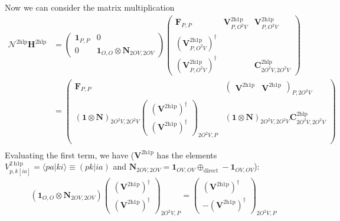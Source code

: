 Now we can consider the matrix multiplication
\begin{align}
    \bm{\mathcal{N}}^{2 \mathrm{hlp}} \bm{H}^{2 \mathrm{hlp}} &= \begin{pmatrix}
        \bm{1}_{P,P} & 0 \\
        0 & \bm{1}_{O,O} \otimes \bm{N}_{2OV,2OV}
    \end{pmatrix}
    \begin{pmatrix}
        \bm{F}_{P,P} & \bm{V}^{2\mathrm{h1p}}_{P,O^2V} & \bm{V}^{2\mathrm{h1p}}_{P,O^2V} \\
        \left(\bm{V}^{2\mathrm{h1p}}_{P,O^2V}\right)^{\dagger} &  &  \\
        \left(\bm{V}^{2\mathrm{h1p}}_{P,O^2V}\right)^{\dagger} &  & \bm{C}^{2\mathrm{hlp}}_{2O^2V,2O^2V}
    \end{pmatrix} \\
&= \begin{pmatrix}
        \bm{F}_{P,P} & \begin{pmatrix} \bm{V}^{2\mathrm{h1p}} & \bm{V}^{2\mathrm{h1p}}\end{pmatrix}_{P,2O^2V} \\
        \left( \bm{1} \otimes \bm{N} \right)_{2O^2V,2O^2V}\begin{pmatrix} \left(\bm{V}^{2\mathrm{h1p}}\right)^{\dagger} \\ \left( \bm{V}^{2\mathrm{h1p}}\right)^{\dagger} \end{pmatrix}_{2O^2V,P} &   \left( \bm{1} \otimes \bm{N} \right)_{2O^2V,2O^2V} \bm{C}^{2\mathrm{hlp}}_{2O^2V,2O^2V}  \\
    \end{pmatrix} \\
\end{align}
Evaluating the first term, we have ($\bm{V}^{2\mathrm{h1p}}$ has the  elements $V_{p, k[ia]}^{2 \mathrm{~h} 1 \mathrm{p}} = \langle p a | k i \rangle \equiv (pk|ia)$ and $\bm{N}_{2OV,2OV}=\bm{1}_{OV,OV} \oplus_{\text{direct}} -\bm{1}_{OV,OV}$):
\begin{align}
    \left( \bm{1}_{O,O} \otimes \bm{N}_{2OV,2OV} \right) \begin{pmatrix}
        \left(\bm{V}^{2\mathrm{h1p}}\right)^{\dagger} \\ \left( \bm{V}^{2\mathrm{h1p}}\right)^{\dagger}
    \end{pmatrix} _{2O^2V,P} =\begin{pmatrix}
        \left(\bm{V}^{2\mathrm{h1p}}\right)^{\dagger} \\ -\left( \bm{V}^{2\mathrm{h1p}}\right)^{\dagger}
    \end{pmatrix} _{2O^2V,P} 
\end{align}
